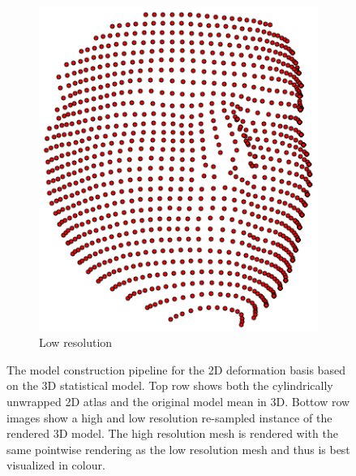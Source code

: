 \begin{figure}
\begin{subfigure}[b]{0.49\textwidth}
        \includegraphics[width=\textwidth]{face_flow/images/contour_snapping/example_instance_low}
        \caption{Low resolution}\label{subfig:face_flow_instance_low}
    \end{subfigure}
    \caption{The model construction pipeline for the 2D deformation basis based
             on the 3D statistical model. Top row shows both the cylindrically
             unwrapped 2D atlas and the original model mean in 3D. Bottow row images
             show a high and low resolution re-sampled instance of the rendered
             3D model. The high resolution mesh is rendered with the same
             pointwise rendering as the low resolution mesh and thus
             is best visualized in colour.}
\label{fig:face_flow_3d_model_instance}
\end{figure}

